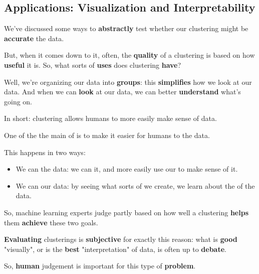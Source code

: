     \subsection{Applications: Visualization and Interpretability}
    
        We've discussed some ways to \textbf{abstractly} test whether our clustering might be \textbf{accurate} the data.
        
        But, when it comes down to it, often, the \textbf{quality} of a clustering is based on how \textbf{useful} it is. So, what sorts of \textbf{uses} does clustering \textbf{have}? 
        
        Well, we're organizing our data into \textbf{groups}: this \textbf{simplifies} how we look at our data. And when we can \textbf{look} at our data, we can better \textbf{understand} what's going on.
        
        In short: clustering allows humans to more easily make sense of data.\\
        
        \begin{concept}
            One of the the main  of  is to make it easier for humans to  the data.
            
            This happens in two ways:
            
            \begin{itemize}
                \item We can  the data: we can  it, and more easily use our  to make sense of it.
                
                \item We can  our data: by seeing what sorts of  we create, we learn about the  of the data.
            \end{itemize}
        \end{concept}
        
        So, machine learning experts judge partly based on how well a clustering \textbf{helps} them \textbf{achieve} these two goals.
        
        \textbf{Evaluating} clusterings is \textbf{subjective} for exactly this reason: what is \textbf{good} "visually", or is the \textbf{best} "interpretation" of data, is often up to \textbf{debate}.
        
        So, \textbf{human} judgement is important for this type of \textbf{problem}.
    
